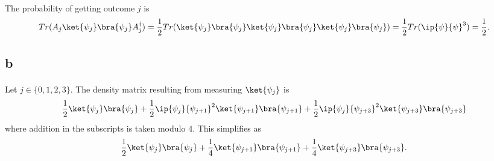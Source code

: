 \documentclass[letterpaper,12pt,oneside,onecolumn]{article}
\begin{document}
\paragraph{}
The probability of getting outcome $j$ is
$$Tr(A_j\ket{\psi_j}\bra{\psi_j}A_j^\dagger) = \frac{1}{2} Tr(\ket{\psi_j}\bra{\psi_j}\ket{\psi_j}\bra{\psi_j}\ket{\psi_j}\bra{\psi_j}) = \frac{1}{2}Tr(\ip{\psi}{\psi}^3) = \frac{1}{2}.$$
\subsection{b}
\paragraph{}
Let $j \in \{0,1,2,3\}$. The density matrix resulting from measuring $\ket{\psi_j}$ is
$$\frac{1}{2}\ket{\psi_j}\bra{\psi_j} + \frac{1}{2}\ip{\psi_j}{\psi_{j+1}}^2\ket{\psi_{j+1}}\bra{\psi_{j+1}} + \frac{1}{2}\ip{\psi_j}{\psi_{j+3}}^2\ket{\psi_{j+3}}\bra{\psi_{j+3}}$$
where addition in the subscripts is taken modulo $4$. This simplifies as
$$\frac{1}{2}\ket{\psi_j}\bra{\psi_j} + \frac{1}{4}\ket{\psi_{j+1}}\bra{\psi_{j+1}} + \frac{1}{4}\ket{\psi_{j+3}}\bra{\psi_{j+3}}.$$
\end{document}
